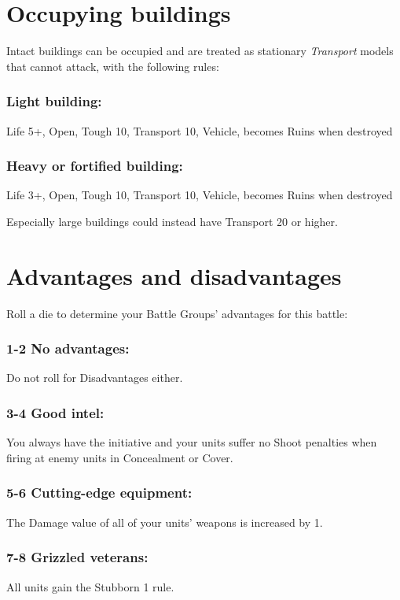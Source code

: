 \begin{multicols}{2}
\section*{Occupying buildings}
Intact buildings can be occupied and are treated as stationary \textit{Transport} models that cannot attack, with the following rules:

\subsubsection*{Light building:} Life 5+, Open, Tough 10, Transport 10, Vehicle, becomes Ruins when destroyed

\subsubsection*{Heavy or fortified building:} Life 3+, Open, Tough 10, Transport 10, Vehicle, becomes Ruins when destroyed

Especially large buildings could instead have Transport 20 or higher.




\section*{Advantages and disadvantages}
Roll a die to determine your Battle Groups' advantages for this battle:
\subsubsection*{1-2 No advantages:} Do not roll for Disadvantages either.

\subsubsection*{3-4 Good intel:} You always have the initiative and your units suffer no Shoot penalties when firing at enemy units in Concealment or Cover.

\subsubsection*{5-6 Cutting-edge equipment:} The Damage value of all of your units' weapons is increased by 1.

\subsubsection*{7-8 Grizzled veterans:} All units gain the Stubborn 1 rule.


\end{multicols}
